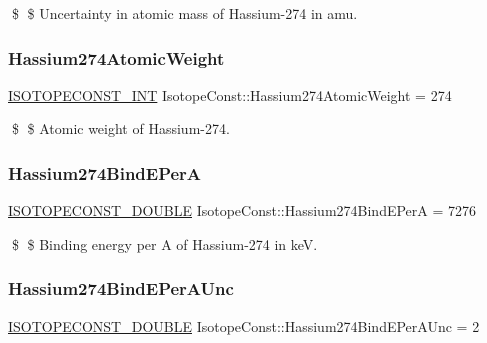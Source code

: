 \$ \$ Uncertainty in atomic mass of Hassium-\/274 in amu. \mbox{\label{group___isotope_const-_hassium-_hs274_ga32f1e37b699672e433a9537a3bbb36b2}} 
\subsubsection{\texorpdfstring{Hassium274\+Atomic\+Weight}{Hassium274AtomicWeight}}
{\footnotesize\ttfamily \mbox{\hyperlink{group___isotope_const-_macros_ga5f18360b3e99483a35c32d789e62621c}{I\+S\+O\+T\+O\+P\+E\+C\+O\+N\+S\+T\+\_\+\+I\+NT}} Isotope\+Const\+::\+Hassium274\+Atomic\+Weight = 274}

\$ \$ Atomic weight of Hassium-\/274. \mbox{\label{group___isotope_const-_hassium-_hs274_gaaeda48a9dd62f02de26a8d06b87eeb27}} 
\subsubsection{\texorpdfstring{Hassium274\+Bind\+E\+PerA}{Hassium274BindEPerA}}
{\footnotesize\ttfamily \mbox{\hyperlink{group___isotope_const-_macros_ga8f45a7272ce02c0b4c65c44636ed719a}{I\+S\+O\+T\+O\+P\+E\+C\+O\+N\+S\+T\+\_\+\+D\+O\+U\+B\+LE}} Isotope\+Const\+::\+Hassium274\+Bind\+E\+PerA = 7276}

\$ \$ Binding energy per A of Hassium-\/274 in keV. \mbox{\label{group___isotope_const-_hassium-_hs274_gaa8a34456705901e8830d8687b4c72e37}} 
\subsubsection{\texorpdfstring{Hassium274\+Bind\+E\+Per\+A\+Unc}{Hassium274BindEPerAUnc}}
{\footnotesize\ttfamily \mbox{\hyperlink{group___isotope_const-_macros_ga8f45a7272ce02c0b4c65c44636ed719a}{I\+S\+O\+T\+O\+P\+E\+C\+O\+N\+S\+T\+\_\+\+D\+O\+U\+B\+LE}} Isotope\+Const\+::\+Hassium274\+Bind\+E\+Per\+A\+Unc = 2}

